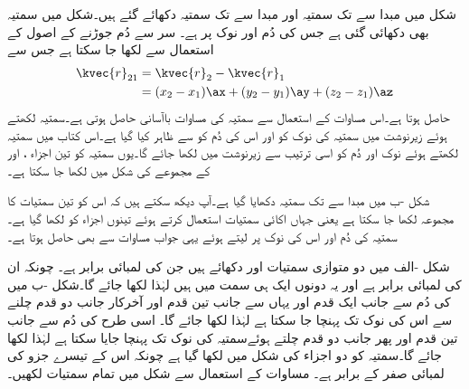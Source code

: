 شکل  میں  مبدا سے  تک سمتیہ  اور  مبدا سے  تک سمتیہ  دکھائے گئے ہیں۔شکل میں سمتیہ  بھی دکھائی گئی ہے جس کی دُم   اور  نوک  پر ہے۔ سر سے دُم جوڑنے کے اصول کے استعمال سے  لکھا جا سکتا ہے جس سے 
\begin{gather}
\begin{aligned}\label{مساوات_سمتیہ_کارتیسی_نظام_میں_قیمت}
\kvec{r}_{21}&=\kvec{r}_2-\kvec{r}_1\\
&=(x_2-x_1) \ax+(y_2-y_1)\ay+(z_2-z_1)\az
\end{aligned}
\end{gather}
حاصل ہوتا ہے۔اس مساوات کے استعمال سے سمتیہ کی مساوات باآسانی حاصل ہوتی ہے۔سمتیہ  لکھتے ہوئے زیرنوشت میں سمتیہ کی نوک کو  اور اس کی دُم  کو  سے ظاہر کیا گیا ہے۔اس کتاب میں سمتیہ لکھتے ہوئے نوک اور دُم  کو اسی ترتیب سے زیرنوشت میں لکھا جائے گا۔یوں سمتیہ  کو تین اجزاء ،  اور  کے  مجموعے کی شکل میں لکھا جا سکتا ہے۔

شکل -ب میں مبدا سے  تک سمتیہ دکھایا گیا ہے۔آپ دیکھ سکتے ہیں کہ اس کو تین سمتیات کا مجموعہ لکھا جا سکتا ہے یعنی  جہاں اکائی سمتیات استعمال کرتے ہوئے تینوں اجزاء کو لکھا گیا ہے۔ سمتیہ کی دُم  اور اس کی نوک  پر لیتے ہوئے  یہی جواب  مساوات  سے بھی حاصل ہوتا ہے۔

شکل -الف میں دو متوازی سمتیات  اور  دکھائے ہیں جن کی لمبائی برابر ہے۔ چونکہ ان کی لمبائی برابر ہے اور یہ دونوں ایک ہی سمت میں ہیں لہٰذا  لکھا جائے گا۔شکل -ب میں  کی دُم سے  جانب ایک قدم اور یہاں سے  جانب تین قدم اور آخرکار  جانب دو قدم چلنے سے اس کی نوک تک پہنچا جا سکتا ہے لہٰذا  لکھا جائے گا۔ اسی طرح  کی دُم سے   جانب تین قدم اور پھر  جانب دو قدم چلتے ہوئےسمتیہ کی نوک تک پہنچا جایا سکتا ہے لہٰذا  لکھا جائے گا۔سمتیہ  کو دو اجزاء کی شکل میں لکھا گیا ہے چونکہ اس کے تیسرے جزو کی لمبائی صفر کے برابر ہے۔
مساوات  کے استعمال سے شکل  میں تمام سمتیات لکھیں۔

